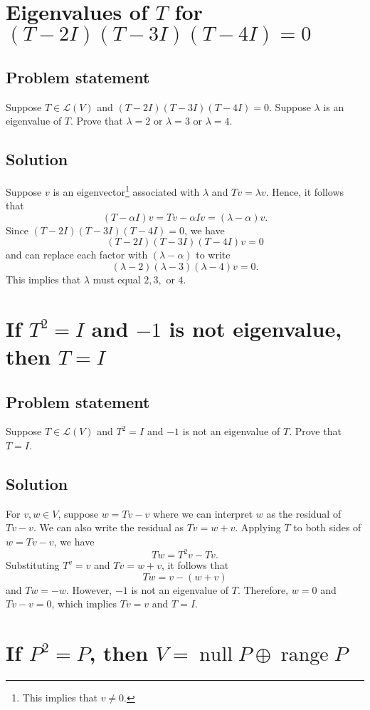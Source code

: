 \documentclass{article}
\begin{document}
\clearpage

\section{Eigenvalues of $T$ for $(T-2I)(T-3I)(T-4I)=0$}
\subsection*{Problem statement}
Suppose $T\in\mathcal{L}(V)$ and $(T-2I)(T-3I)(T-4I)=0$. 
Suppose $\lambda$ is an eigenvalue of $T$. 
Prove that $\lambda=2$ or $\lambda=3$ or $\lambda=4$.

\subsection*{Solution}
Suppose $v$ is an eigenvector\footnote{This implies that $v\neq 0$.} associated with $\lambda$ and $Tv=\lambda v$. 
Hence, it follows that 
\[(T-\alpha I)v=Tv-\alpha I v=(\lambda-\alpha)v.\]
Since $(T-2I)(T-3I)(T-4I)=0$, we have
\[(T-2I)(T-3I)(T-4I)v=0\]
and can replace each factor with $(\lambda-\alpha)$ to write
\[(\lambda-2)(\lambda-3)(\lambda-4)v=0.\]
This implies that $\lambda$ must equal $2,3,$ or $4$.

\clearpage

\section{If $T^2=I$ and $-1$ is not eigenvalue, then $T=I$}
\subsection*{Problem statement}
Suppose $T\in\mathcal{L}(V)$ and $T^2=I$ and $-1$ is not an eigenvalue of $T$. 
Prove that $T=I$.

\subsection*{Solution}
For $v,w\in V$, suppose $w=Tv-v$ where we can interpret $w$ as the residual of $Tv-v$. 
We can also write the residual as $Tv=w+v$. 
Applying $T$ to both sides of $w=Tv-v$, we have 
\[Tw=T^2v-Tv.\]
Substituting $T^v=v$ and $Tv=w+v$, it follows that
\[Tw=v-(w+v)\]
and $Tw=-w$. 
However, $-1$ is not an eigenvalue of $T$. 
Therefore, $w=0$ and $Tv-v=0$, which implies $Tv=v$ and $T=I$.

\clearpage

\section{If $P^2=P$, then $V=\operatorname{null}P\oplus\operatorname{range}P$}
\end{document}
